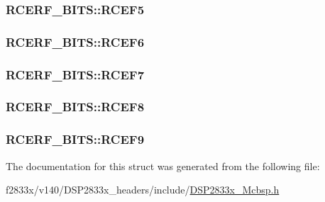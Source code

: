 \subsubsection[{R\+C\+E\+F5}]{ R\+C\+E\+R\+F\+\_\+\+B\+I\+T\+S\+::\+R\+C\+E\+F5}\label{struct_r_c_e_r_f___b_i_t_s_a99a5af8dc1d576d2b7f27c82d8af86b7}
\hypertarget{struct_r_c_e_r_f___b_i_t_s_aefb238e8d9fb422dcdcdd83449d3c48e}{}
\subsubsection[{R\+C\+E\+F6}]{ R\+C\+E\+R\+F\+\_\+\+B\+I\+T\+S\+::\+R\+C\+E\+F6}\label{struct_r_c_e_r_f___b_i_t_s_aefb238e8d9fb422dcdcdd83449d3c48e}
\hypertarget{struct_r_c_e_r_f___b_i_t_s_a65ead94f0d2f805b2b3fe7549d3aa702}{}
\subsubsection[{R\+C\+E\+F7}]{ R\+C\+E\+R\+F\+\_\+\+B\+I\+T\+S\+::\+R\+C\+E\+F7}\label{struct_r_c_e_r_f___b_i_t_s_a65ead94f0d2f805b2b3fe7549d3aa702}
\hypertarget{struct_r_c_e_r_f___b_i_t_s_a071d541c71a2f82658540cad453ed877}{}
\subsubsection[{R\+C\+E\+F8}]{ R\+C\+E\+R\+F\+\_\+\+B\+I\+T\+S\+::\+R\+C\+E\+F8}\label{struct_r_c_e_r_f___b_i_t_s_a071d541c71a2f82658540cad453ed877}
\hypertarget{struct_r_c_e_r_f___b_i_t_s_a343287edaa323b8a98524b000345bfd3}{}
\subsubsection[{R\+C\+E\+F9}]{ R\+C\+E\+R\+F\+\_\+\+B\+I\+T\+S\+::\+R\+C\+E\+F9}\label{struct_r_c_e_r_f___b_i_t_s_a343287edaa323b8a98524b000345bfd3}


The documentation for this struct was generated from the following file\+:\begin{DoxyCompactItemize}
\item 
f2833x/v140/\+D\+S\+P2833x\+\_\+headers/include/\hyperlink{_d_s_p2833x___mcbsp_8h}{D\+S\+P2833x\+\_\+\+Mcbsp.\+h}\end{DoxyCompactItemize}
